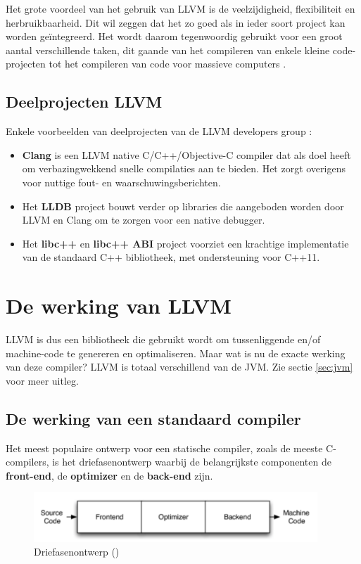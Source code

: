 Het grote voordeel van het gebruik van LLVM is de veelzijdigheid, flexibiliteit en herbruikbaarheid. Dit wil zeggen dat het zo goed als in ieder soort project kan worden geïntegreerd. Het wordt daarom tegenwoordig gebruikt voor een groot aantal verschillende taken, dit gaande van het compileren van enkele kleine code-projecten tot het compileren van code voor massieve computers \autocite{LLVM}.

\subsection{Deelprojecten LLVM}
Enkele voorbeelden van deelprojecten van de LLVM developers group \autocite{LLVM}:
\begin{itemize}
	\item \textbf{Clang} is een LLVM native C/C++/Objective-C compiler dat als doel heeft om verbazingwekkend snelle compilaties aan te bieden. Het zorgt overigens voor nuttige fout- en waarschuwingsberichten.
	\item Het \textbf{LLDB} project bouwt verder op libraries die aangeboden worden door LLVM en Clang om te zorgen voor een native debugger.
	\item Het \textbf{libc++} en \textbf{libc++ ABI} project voorziet een krachtige implementatie van de standaard C++ bibliotheek, met ondersteuning voor C++11. 
\end{itemize}

\section{De werking van LLVM}
LLVM is dus een bibliotheek die gebruikt wordt om tussenliggende en/of machine-code te genereren en optimaliseren. Maar wat is nu de exacte werking van deze compiler? LLVM is totaal verschillend van de JVM. Zie sectie \ref{sec:jvm} voor meer uitleg.

\subsection{De werking van een standaard compiler}
Het meest populaire ontwerp voor een statische compiler, zoals de meeste C-compilers, is het driefasenontwerp waarbij de belangrijkste componenten de \textbf{front-end}, de \textbf{optimizer} en de \textbf{back-end} zijn. 

\begin{figure} [ht]
	\centering
	\includegraphics[width=0.95\textwidth]{img/driefasenmodel}
	\caption{Driefasenontwerp (\cite{aosa})}
	\label{fig:driefasenontwerp}
\end{figure}

